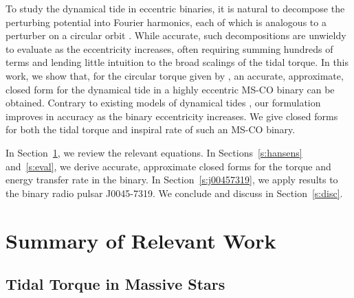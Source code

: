 \documentclass[
        fleqn,
        usenatbib,
    ]{mnras}
\begin{document}
To study the dynamical tide in eccentric binaries, it is natural to decompose
the perturbing potential into Fourier harmonics, each of which is analogous to a
perturber on a circular orbit \citep[e.g.][]{sl, vlf}. While accurate, such
decompositions are unwieldy to evaluate as the eccentricity increases, often
requiring summing hundreds of terms and lending little intuition to the broad
scalings of the tidal torque. In this work, we show that, for the circular
torque given by \citet{kushnir}, an accurate, approximate, closed form for the
dynamical tide in a highly eccentric MS-CO binary can be obtained. Contrary to
existing models of dynamical tides \citep[e.g.][]{vigna2020common}, our
formulation improves in accuracy as the binary eccentricity increases.  We give
closed forms for both the tidal torque and inspiral rate of such an MS-CO
binary.

In Section~\ref{s:background}, we review the relevant equations. In
Sections~\ref{s:hansens} and~\ref{s:eval}, we derive accurate, approximate
closed forms for the torque and energy transfer rate in the binary. In
Section~\ref{s:j00457319}, we apply results to the binary radio pulsar
J0045-7319. We conclude and discuss in Section~\ref{s:disc}.

\section{Summary of Relevant Work}\label{s:background}

\subsection{Tidal Torque in Massive Stars}
\end{document}
